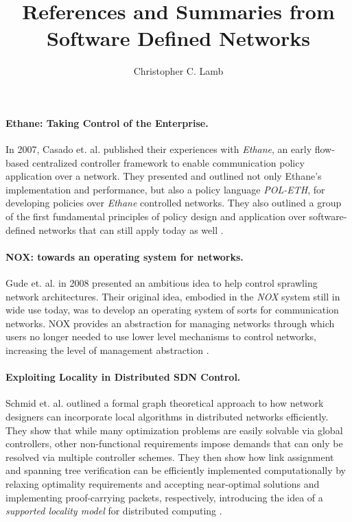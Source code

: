 \documentclass[10pt,letterpaper]{article}
\author{Christopher C. Lamb}
\title{References and Summaries from Software Defined Networks}
\begin{document}
\maketitle
\paragraph{Ethane: Taking Control of the Enterprise.} In 2007, Casado et. al. published their experiences with {\sl Ethane}, an early flow-based centralized controller framework to enable communication policy application over a network.  They presented and outlined not only Ethane's implementation and performance, but also a policy language {\sl POL-ETH}, for developing policies over {\sl Ethane} controlled networks.  They also outlined a group of the first fundamental principles of policy design and application over software-defined networks that can still apply today as well \cite{CaFrPeLu:07}.

\paragraph{NOX: towards an operating system for networks.}  Gude et. al. in 2008 presented an ambitious idea to help control sprawling network architectures.  Their original idea, embodied in the {\sl NOX} system still in wide use today, was to develop an operating system of sorts for communication networks.  NOX provides an abstraction for managing networks through which users no longer needed to use lower level mechanisms to control networks, increasing the level of management abstraction \cite{GuKoPePf:08}.

\paragraph{Exploiting Locality in Distributed SDN Control.} Schmid et. al. outlined a formal graph theoretical approach to how network designers can incorporate local algorithms in distributed networks efficiently.  They show that while many optimization problems are easily solvable via global controllers, other non-functional requirements impose demands that can only be resolved via multiple controller schemes. They then show how link assignment and spanning tree verification can be efficiently implemented computationally by relaxing optimality requirements and accepting near-optimal solutions and implementing proof-carrying packets, respectively, introducing the idea of a {\sl supported locality model} for distributed computing \cite{ScSu:13}.  
\end{document}
